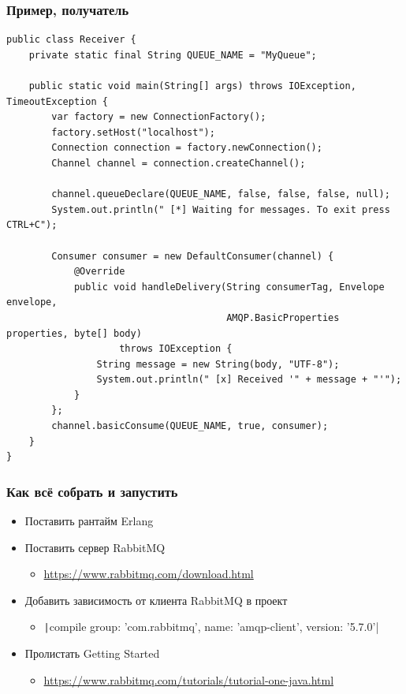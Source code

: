 \documentclass[xetex,mathserif,serif]{beamer}
\begin{document}
    \begin{frame}[fragile]
        \frametitle{Пример, получатель}
        \begin{ssmall}
            \begin{verbatim}
public class Receiver {
    private static final String QUEUE_NAME = "MyQueue";

    public static void main(String[] args) throws IOException, TimeoutException {
        var factory = new ConnectionFactory();
        factory.setHost("localhost");
        Connection connection = factory.newConnection();
        Channel channel = connection.createChannel();

        channel.queueDeclare(QUEUE_NAME, false, false, false, null);
        System.out.println(" [*] Waiting for messages. To exit press CTRL+C");

        Consumer consumer = new DefaultConsumer(channel) {
            @Override
            public void handleDelivery(String consumerTag, Envelope envelope,
                                       AMQP.BasicProperties properties, byte[] body)
                    throws IOException {
                String message = new String(body, "UTF-8");
                System.out.println(" [x] Received '" + message + "'");
            }
        };
        channel.basicConsume(QUEUE_NAME, true, consumer);
    }
}
            \end{verbatim}
        \end{ssmall}
    \end{frame}

    \begin{frame}
        \frametitle{Как всё собрать и запустить}
        \begin{itemize}
            \item Поставить рантайм Erlang
            \item Поставить сервер RabbitMQ
            \begin{itemize}
                \item \url{https://www.rabbitmq.com/download.html}
            \end{itemize}
            \item Добавить зависимость от клиента RabbitMQ в проект
            \begin{itemize}
                \item \texttt|compile group: 'com.rabbitmq', name: 'amqp-client', version: '5.7.0'|
            \end{itemize}
            \item Пролистать Getting Started 
            \begin{itemize}
                \item \url{https://www.rabbitmq.com/tutorials/tutorial-one-java.html}
            \end{itemize}
        \end{itemize}
    \end{frame}
\end{document}
